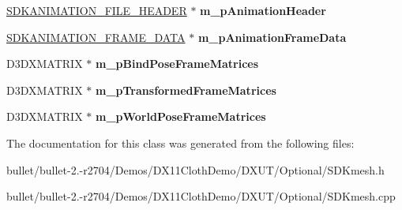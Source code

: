 \begin{DoxyCompactItemize}
\item 
\hypertarget{class_c_d_x_u_t_s_d_k_mesh_aeeb6651620183c2087a7e8e1b6f02517}{\hyperlink{struct_s_d_k_a_n_i_m_a_t_i_o_n___f_i_l_e___h_e_a_d_e_r}{S\+D\+K\+A\+N\+I\+M\+A\+T\+I\+O\+N\+\_\+\+F\+I\+L\+E\+\_\+\+H\+E\+A\+D\+E\+R} $\ast$ {\bfseries m\+\_\+p\+Animation\+Header}}\label{class_c_d_x_u_t_s_d_k_mesh_aeeb6651620183c2087a7e8e1b6f02517}

\item 
\hypertarget{class_c_d_x_u_t_s_d_k_mesh_a7a103b69068cd6b4a970e427e1d8128a}{\hyperlink{struct_s_d_k_a_n_i_m_a_t_i_o_n___f_r_a_m_e___d_a_t_a}{S\+D\+K\+A\+N\+I\+M\+A\+T\+I\+O\+N\+\_\+\+F\+R\+A\+M\+E\+\_\+\+D\+A\+T\+A} $\ast$ {\bfseries m\+\_\+p\+Animation\+Frame\+Data}}\label{class_c_d_x_u_t_s_d_k_mesh_a7a103b69068cd6b4a970e427e1d8128a}

\item 
\hypertarget{class_c_d_x_u_t_s_d_k_mesh_ab78e5e86658dc77b2b332ec1756e9259}{D3\+D\+X\+M\+A\+T\+R\+I\+X $\ast$ {\bfseries m\+\_\+p\+Bind\+Pose\+Frame\+Matrices}}\label{class_c_d_x_u_t_s_d_k_mesh_ab78e5e86658dc77b2b332ec1756e9259}

\item 
\hypertarget{class_c_d_x_u_t_s_d_k_mesh_ac8db4f1a6f1df5f7f768e5afb0b1b941}{D3\+D\+X\+M\+A\+T\+R\+I\+X $\ast$ {\bfseries m\+\_\+p\+Transformed\+Frame\+Matrices}}\label{class_c_d_x_u_t_s_d_k_mesh_ac8db4f1a6f1df5f7f768e5afb0b1b941}

\item 
\hypertarget{class_c_d_x_u_t_s_d_k_mesh_a91084cf1cdccf950b0271cade57c609f}{D3\+D\+X\+M\+A\+T\+R\+I\+X $\ast$ {\bfseries m\+\_\+p\+World\+Pose\+Frame\+Matrices}}\label{class_c_d_x_u_t_s_d_k_mesh_a91084cf1cdccf950b0271cade57c609f}

\end{DoxyCompactItemize}


The documentation for this class was generated from the following files\+:\begin{DoxyCompactItemize}
\item 
bullet/bullet-\/2.-\/r2704/\+Demos/\+D\+X11\+Cloth\+Demo/\+D\+X\+U\+T/\+Optional/S\+D\+Kmesh.\+h\item 
bullet/bullet-\/2.-\/r2704/\+Demos/\+D\+X11\+Cloth\+Demo/\+D\+X\+U\+T/\+Optional/S\+D\+Kmesh.\+cpp\end{DoxyCompactItemize}
